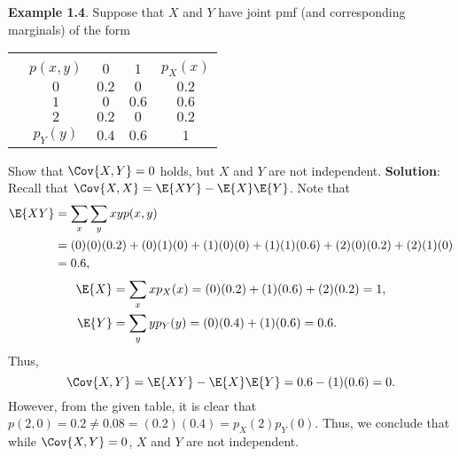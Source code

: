 \begin{Example}
    \textbf{Example 1.4}. Suppose that $ X $ and $ Y $ have joint pmf (and corresponding marginals) of the form
    \begin{center}
        \begin{NiceTabular}{cc|cc|c}
            &                                                                               \\%
            &$ p(x,y) $   & $ 0 $               & $ 1 $ & $ p_X(x) $                                \\
             & $ 0 $              & $ 0.2 $                     & $ 0 $                       & $ 0.2 $                   \\%
            & $ 1 $            & $ 0 $                     & $ 0.6 $                       & $ 0.6 $                   \\
            & $ 2 $            & $ 0.2 $                     & $ 0 $                       & $ 0.2 $                   \\
            & $ p_Y(y) $                  & $ 0.4 $ & $ 0.6 $ & $ 1 $
        \end{NiceTabular}
    \end{center}
    Show that $ \Cov{X,Y}=0 $ holds, but $ X $ and $ Y $ are not independent.
    \tcblower{}
    \textbf{Solution}: Recall that $ \Cov{X,X}=\E{XY}-\E{X}\E{Y} $. Note that
    \begin{align*}
        \E{XY}
         & =\sum_x\sum_y xyp(x,y)                                             \\
         & =(0)(0)(0.2)+(0)(1)(0)+(1)(0)(0)+(1)(1)(0.6)+(2)(0)(0.2)+(2)(1)(0) \\
         & =0.6,
    \end{align*}
    \begin{align*}
        \E{X} & =\sum_x x p_X(x)=(0)(0.2)+(1)(0.6)+(2)(0.2)=1, \\
        \E{Y} & =\sum_y y p_Y(y)=(0)(0.4)+(1)(0.6)=0.6.
    \end{align*}
    Thus,
    \[ \Cov{X,Y}=\E{XY}-\E{X}\E{Y}=0.6-(1)(0.6)=0. \]
    However, from the given table, it is clear that $ p(2,0)=0.2\ne 0.08=(0.2)(0.4)=p_X(2)p_Y(0) $. Thus, we
    conclude that while $ \Cov{X,Y}=0 $, $ X $ and $ Y $ are not independent.
\end{Example}
